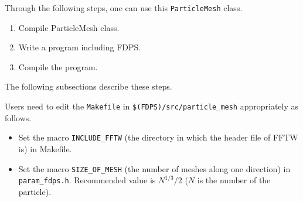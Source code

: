 

Through the following steps, one can use this {\tt ParticleMesh} class.

\begin{enumerate}
\item Compile ParticleMesh class.
\item Write a program including FDPS.
\item Compile the program.
\end{enumerate}

The following subsections describe these steps.




Users need to edit the {\tt Makefile} in
{\tt \$(FDPS)/src/particle\_mesh} appropriately as follows.

\begin{itemize}
\item Set the macro {\tt INCLUDE\_FFTW} (the directory in which the header file of FFTW is) in Makefile.
\item Set the macro {\tt SIZE\_OF\_MESH} (the number of meshes along one direction) in {\tt param\_fdps.h}.
Recommended value is $N^{1/3}/2$ ($N$ is the number of the particle).
\end{itemize}

